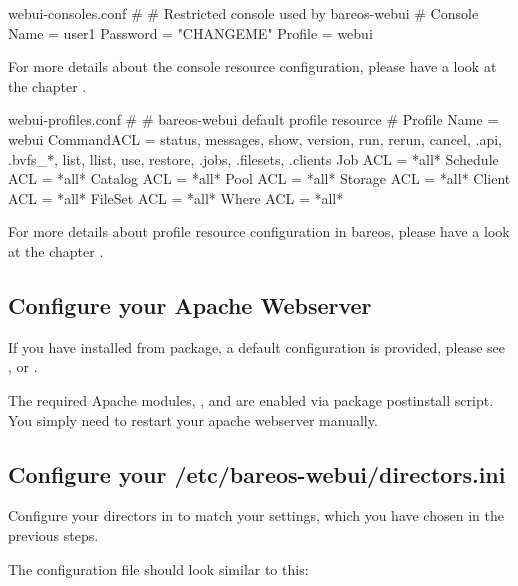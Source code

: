 \begin{bconfig}{webui-consoles.conf}
#
# Restricted console used by bareos-webui
#
Console {
  Name = user1
  Password = "CHANGEME"
  Profile = webui
}
\end{bconfig}

For more details about the console resource configuration, please have a look at the chapter .

\begin{bconfig}{webui-profiles.conf}
#
# bareos-webui default profile resource
#
Profile {
  Name = webui
  CommandACL = status, messages, show, version, run, rerun, cancel, .api, .bvfs_*, list, llist, use, restore, .jobs, .filesets, .clients
  Job ACL = *all*
  Schedule ACL = *all*
  Catalog ACL = *all*
  Pool ACL = *all*
  Storage ACL = *all*
  Client ACL = *all*
  FileSet ACL = *all*
  Where ACL = *all*
}
\end{bconfig}

For more details about profile resource configuration in bareos, please have a look at the chapter .


\subsection{Configure your Apache Webserver}


If you have installed from package, a default configuration is provided, please see ,  or .

The required Apache modules, ,  and  are enabled via package postinstall script. You simply need to restart your apache webserver manually.

\subsection{Configure your /etc/bareos-webui/directors.ini}

Configure your directors in  to match your settings, which you have chosen in the previous steps.

The configuration file  should look similar to this:

